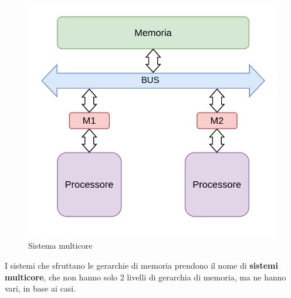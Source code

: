 \begin{figure}
    \centering
    \includegraphics[width=.5\textwidth]{img/P-M-BUS-M-P.png}
    \caption{Sistema multicore}\label{img:multi-core}
\end{figure}
I sistemi che sfruttano le gerarchie di memoria prendono il nome di \textbf{sistemi multicore}, che non hanno solo 2 livelli di gerarchia di memoria, ma ne hanno vari, in base ai casi.

